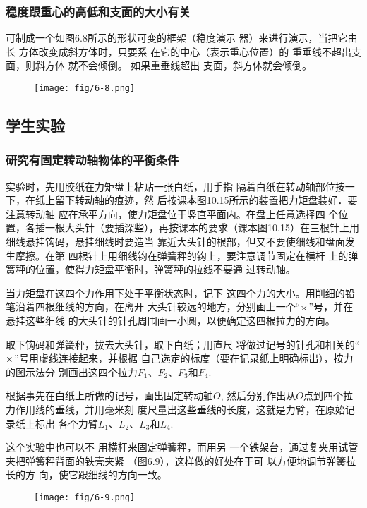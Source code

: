 \subsubsection{稳度跟重心的高低和支面的大小有关}
可制成一个如图6.8所示的形状可变的框架（稳度演示
器）来进行演示，当把它由长
方体改变成斜方体时，只要系
在它的中心（表示重心位置）的
重垂线不超出支面，则斜方体
就不会倾倒。
如果重垂线超出
支面，斜方体就会倾倒。

\begin{figure}[htp]
    \centering
    \texttt{[image: fig/6-8.png]}
    \caption{}
\end{figure}

\subsection{学生实验}
\subsubsection{研究有固定转动轴物体的平衡条件}

实验时，先用胶纸在力矩盘上粘贴一张白纸，用手指
隔着白纸在转动轴部位按一下，在纸上留下转动轴的痕迹，然
后按课本图10.15所示的装置把力矩盘装好．要注意转动轴
应在承平方向，使力矩盘位于竖直平面内。在盘上任意选择四
个位置，各插一根大头针（要插深些），再按课本的要求（课本图10.15）在三根针上用细线悬挂钩码，悬挂细线时要造当
靠近大头针的根部，但又不要使细线和盘面发生摩擦。在第
四根针上用细线钩在弹簧秤的钩上，要注意调节固定在横杆
上的弹簧秤的位置，使得力矩盘平衡时，弹簧秤的拉线不要通
过转动轴。

当力矩盘在这四个力作用下处于平衡状态时，记下
这四个力的大小。用削细的铅笔沿着四根细线的方向，在离开
大头针较远的地方，分别画上一个“$\times$”号，并在悬挂这些细线
的大头针的针孔周围画一小圆，以便确定这四根拉力的方向。

取下钩码和弹簧秤，拔去大头针，取下白纸；用直尺
将做过记号的针孔和相关的“$\times$”号用虚线连接起来，并根据
自己选定的标度（要在记录纸上明确标出），按力的图示法分
别画出这四个拉力$F_1$、$F_2$、$F_3$和$F_4$.

根据事先在白纸上所做的记号，画出固定转动轴$O$,
然后分别作出从$O$点到四个拉力作用线的垂线，并用毫米刻
度尺量出这些垂线的长度，这就是力臂，在原始记录纸上标出
各个力臂$L_1$、$L_2$、$L_3$和$L_4$.

这个实验中也可以不
用横杆来固定弹簧秤，而用另
一个铁架台，通过复夹用试管
夹把弹簧秤背面的铁壳夹紧
（图6.9），这样做的好处在于可
以方便地调节弹簧拉长的方
向，使它跟细线的方向一致。

\begin{figure}[htp]
    \centering
    \texttt{[image: fig/6-9.png]}
    \caption{}
\end{figure}

